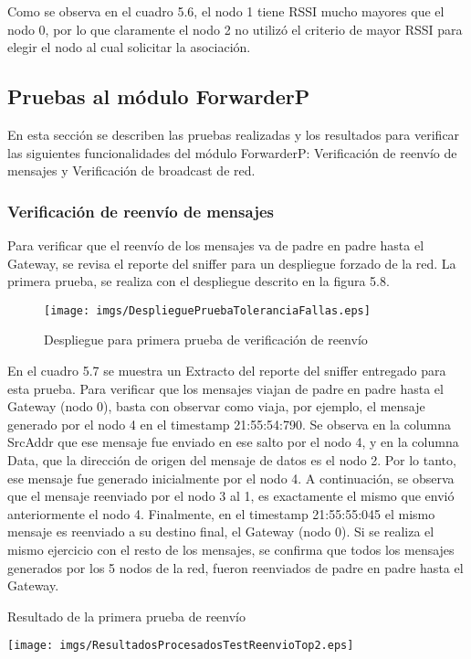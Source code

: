 Como se observa en el cuadro 5.6, el nodo 1 tiene RSSI mucho mayores que el nodo 0, por lo que claramente el nodo 2 no utilizó el criterio de mayor RSSI para elegir el nodo al cual solicitar la asociación.

\subsection{Pruebas al módulo ForwarderP}
En esta sección se describen las pruebas realizadas y los resultados para verificar las siguientes funcionalidades del módulo ForwarderP: Verificación de reenvío de mensajes y Verificación de broadcast de red.

\subsubsection{Verificación de reenvío de mensajes}
Para verificar que el reenvío de los mensajes va de padre en padre hasta el Gateway, se revisa el reporte del sniffer para un despliegue forzado de la red. La primera prueba, se realiza con el despliegue descrito en la figura 5.8.

\begin{figure}[H]
	\centering
 	\texttt{[image: imgs/DesplieguePruebaToleranciaFallas.eps]} 
 	\caption{Despliegue para primera prueba de verificación de reenvío}
\end{figure}
 
En el cuadro 5.7 se muestra un Extracto del reporte del sniffer entregado para esta prueba. Para verificar que los mensajes viajan de padre en padre hasta el Gateway (nodo 0), basta con observar como viaja, por ejemplo, el mensaje generado por el nodo 4 en el timestamp 21:55:54:790. Se observa en la columna SrcAddr que ese mensaje fue enviado en ese salto por el nodo 4, y en la columna Data, que la dirección de origen del mensaje de datos es el nodo 2. Por lo tanto, ese mensaje fue generado inicialmente por el nodo 4. A continuación, se observa que el mensaje reenviado por el nodo 3 al 1, es exactamente el mismo que envió anteriormente el nodo 4. Finalmente, en el timestamp 21:55:55:045 el mismo mensaje es reenviado a su destino final, el Gateway (nodo 0). Si se realiza el mismo ejercicio con el resto de los mensajes, se confirma que todos los mensajes generados por los 5 nodos de la red, fueron reenviados de padre en padre hasta el Gateway. 
 
\begin{center}
\begin{table}[H]
\caption{Resultado de la primera prueba de reenvío}
 \texttt{[image: imgs/ResultadosProcesadosTestReenvioTop2.eps]}
\end{table}
\end{center}

